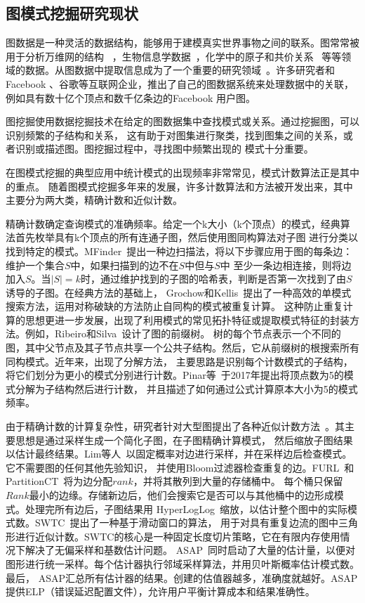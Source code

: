 \documentclass[master]{thesis-uestc}
\begin{document}
\subsection{图模式挖掘研究现状}
    图数据是一种灵活的数据结构，能够用于建模真实世界事物之间的联系。图常常被用于分析万维网的结构
~\cite{WebgraphFramework}，生物信息学数据~\cite{DeNovo}，化学中的原子和共价关系~\cite{Chemistry}
等等领域的数据。从图数据中提取信息成为了一个重要的研究领域~\cite{NetworkScience}。许多研究者和Facebook
、谷歌等互联网企业，推出了自己的图数据系统来处理数据中的关联，例如具有数十亿个顶点和数千亿条边的Facebook
用户图。

    图挖掘使用数据挖掘技术在给定的图数据集中查找模式或关系。通过挖掘图，可以识别频繁的子结构和关系，
这有助于对图集进行聚类，找到图集之间的关系，或者识别或描述图。图挖掘过程中，寻找图中频繁出现的
模式十分重要。

    在图模式挖掘的典型应用中统计模式的出现频率非常常见，模式计数算法正是其中的重点。
随着图模式挖掘多年来的发展，许多计数算法和方法被开发出来，其中主要分为两大类，精确计数和近似计数。

    精确计数确定查询模式的准确频率。给定一个k大小（k个顶点）的模式，经典算法首先枚举具有k个顶点的所有连通子图，然后使用图同构算法对子图
进行分类以找到特定的模式。MFinder~\cite{Motifs}提出一种边扫描法，将以下步骤应用于图的每条边：维护一个集合$S$中，如果扫描到的边不在$S$中但与$S$中
至少一条边相连接，则将边加入$S$。当$|S|=k$时，通过维护找到的子图的哈希表，判断是否第一次找到了由$S$诱导的子图。在经典方法的基础上，
Grochow和Kellis~\cite{MotifUseSymmetryBreaking}提出了一种高效的单模式搜索方法，运用对称破缺的方法防止自同构的模式被重复计算。
这种防止重复计算的思想更进一步发展，出现了利用模式的常见拓扑特征或提取模式特征的封装方法。例如，Ribeiro和Silva~\cite{GTries}设计了图的前缀树。
树的每个节点表示一个不同的图，其中父节点及其子节点共享一个公共子结构。然后，它从前缀树的根搜索所有同构模式。近年来，出现了分解方法，
主要思路是识别每个计数模式的子结构，将它们划分为更小的模式分别进行计数。Pinar等~\cite{ESCAPE}于2017年提出将顶点数为5的模式分解为子结构然后进行计数，
并且描述了如何通过公式计算原本大小为5的模式频率。

    由于精确计数的计算复杂性，研究者针对大型图提出了各种近似计数方法~\cite{SampleInBigGraph}。其主要思想是通过采样生成一个简化子图，在子图精确计算模式，
然后缩放子图结果以估计最终结果。Lim等人~\cite{MemoryEfficient}以固定概率对边进行采样，并在采样边后检查模式。它不需要图的任何其他先验知识，
并使用Bloom过滤器检查重复的边。FURL~\cite{FURL}和PartitionCT~\cite{PartitionCT}将为边分配$rank$，并将其散列到大量的存储桶中。
每个桶只保留$Rank$最小的边缘。存储新边后，他们会搜索它是否可以与其他桶中的边形成模式。处理完所有边后，子图结果用
HyperLogLog~\cite{HyperLogLog}缩放，以估计整个图中的实际模式数。SWTC~\cite{SlidingWindow}提出了一种基于滑动窗口的算法，
用于对具有重复边流的图中三角形进行近似计数。SWTC的核心是一种固定长度切片策略，它在有限内存使用情况下解决了无偏采样和基数估计问题。
ASAP~\cite{ASAP}同时启动了大量的估计量，以便对图形进行统一采样。每个估计器执行邻域采样算法，并用贝叶斯概率估计模式数。最后，
ASAP汇总所有估计器的结果。创建的估值器越多，准确度就越好。ASAP提供ELP（错误延迟配置文件），允许用户平衡计算成本和结果准确性。
\end{document}
